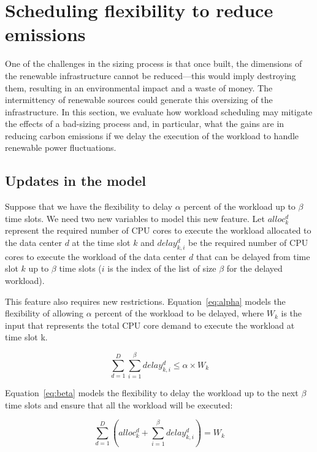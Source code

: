 \section{Scheduling flexibility to reduce  emissions}

One of the challenges in the sizing process is that once built, the dimensions of the renewable infrastructure cannot be reduced---this would imply destroying them, resulting in an environmental impact and a waste of money. The intermittency of renewable sources could generate this oversizing of the infrastructure. In this section, we evaluate how workload scheduling may mitigate the effects of a bad-sizing process and, in particular, what the gains are in reducing carbon emissions if we delay the execution of the workload to handle renewable power fluctuations.

\label{sec:flexibility}

\subsection{Updates in the model}

Suppose that we have the flexibility to delay $\alpha$ percent of the workload up to $\beta$ time slots. We need two new variables to model this new feature. Let $alloc^d_k$ represent the required number of CPU cores  to execute the workload allocated to the data center $d$ at the time slot $k$ and $delay_{k,i}^d$ be the required number of CPU cores to execute the workload of the data center $d$ that can be delayed from time slot $k$ up to $\beta$ time slots ($i$ is the index of the list of size $\beta$ for the delayed workload). 

This feature also requires new restrictions. Equation~\eqref{eq:alpha} models the flexibility of allowing $\alpha$ percent of the workload to be delayed, where $W_k$ is the input that represents the total CPU core demand to execute the workload at time slot k.


\begin{equation} \label{eq:alpha}
   \sum_{d=1}^D  \sum_{i=1}^{\beta} delay_{k,i}^d \leq  \alpha   \times W_k
\end{equation}


Equation~\eqref{eq:beta} models the flexibility to delay the workload up to the next $\beta$ time slots and ensure that all the workload will be executed:


\begin{equation} \label{eq:beta}
  \sum_{d=1}^D    (alloc_k^d +    \sum_{i=1}^{\beta} delay_{k,i}^d) = W_k  
\end{equation}


